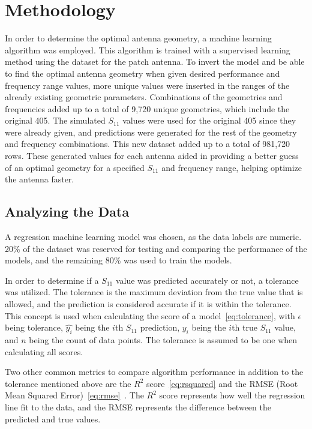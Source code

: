 \documentclass[conference]{IEEEtran}
\begin{document}
\section{Methodology}
In order to determine the optimal antenna geometry, a machine learning algorithm was employed. This algorithm is trained with a supervised learning method using the dataset for the patch antenna. To invert the model and be able to find the optimal antenna geometry when given desired performance and frequency range values, more unique values were inserted in the ranges of the already existing geometric parameters. Combinations of the geometries and frequencies added up to a total of 9,720 unique geometries, which include the original 405. The simulated $S_{11}$ values were used for the original 405 since they were already given, and predictions were generated for the rest of the geometry and frequency combinations. This new dataset added up to a total of 981,720 rows. These generated values for each antenna aided in providing a better guess of an optimal geometry for a specified $S_{11}$ and frequency range, helping optimize the antenna faster. 

\subsection{Analyzing the Data}
A regression machine learning model was chosen, as the data labels are numeric. 20\% of the dataset was reserved for testing and comparing the performance of the models, and the remaining 80\% was used to train the models.

In order to determine if a $S_{11}$ value was predicted accurately or not, a tolerance was utilized. The tolerance is the maximum deviation from the true value that is allowed, and the prediction is considered accurate if it is within the tolerance. This concept is used when calculating the score of a model~\eqref{eq:tolerance}, with $\epsilon$ being tolerance, $\hat{y_i}$ being the $i$th $S_{11}$ prediction, $y_i$ being the $i$th true $S_{11}$ value, and $n$ being the count of data points. The tolerance is assumed to be one when calculating all scores.

Two other common metrics to compare algorithm performance in addition to the tolerance mentioned above are the $R^2$ score~\eqref{eq:rsquared} and the RMSE (Root Mean Squared Error)~\eqref{eq:rmse}~\cite{haque_machine_2023,m_el-kenawy_optimized_2022}. The $R^2$ score represents how well the regression line fit to the data, and the RMSE represents the difference between the predicted and true values.
\end{document}
